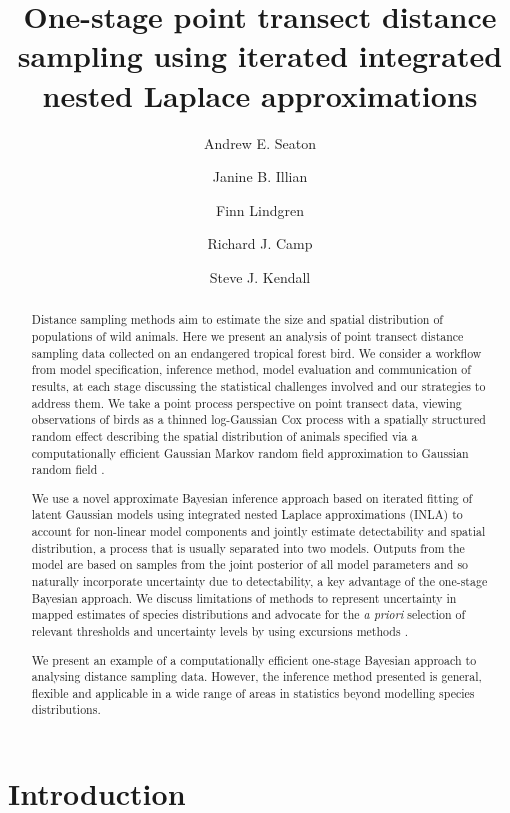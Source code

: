 \documentclass{stylefile16/statsoc}
\title[One-stage point transect distance sampling using iterated INLA]{One-stage point transect distance sampling using iterated integrated nested Laplace approximations}
\author[Andrew E. Seaton {\it et al.}]{Andrew E. Seaton}
\author{Janine B. Illian}
\author{Finn Lindgren}
\author{Richard J. Camp}
\author[Andrew E. Seaton \textit{et al.}]{Steve J. Kendall}
\begin{document}
\begin{abstract}
Distance sampling methods aim to estimate the size and spatial distribution of populations of wild animals.  Here we present an analysis of point transect distance sampling data collected on an endangered tropical forest bird.  We consider a workflow from model specification, inference method, model evaluation and communication of results, at each stage discussing the statistical challenges involved and our strategies to address them.  We take a point process perspective on point transect data, viewing observations of birds as a thinned log-Gaussian Cox process with a spatially structured random effect describing the spatial distribution of animals specified via a computationally efficient Gaussian Markov random field approximation to Gaussian random field \citep{lindgren_explicit_2011}.  

We use a novel approximate Bayesian inference approach based on iterated fitting of latent Gaussian models using integrated nested Laplace approximations (INLA) \citep{rue_approximate_2009} to account for non-linear model components and jointly estimate detectability and spatial distribution, a process that is usually separated into two models.  Outputs from the model are based on samples from the joint posterior of all model parameters and so naturally incorporate uncertainty due to detectability, a key advantage of the one-stage Bayesian approach.  We discuss limitations of methods to represent uncertainty in mapped estimates of species distributions and advocate for the \textit{a priori} selection of relevant thresholds and uncertainty levels by using excursions methods \citep{bolin_excursion_2015}.

We present an example of a computationally efficient one-stage Bayesian approach to analysing distance sampling data.  However, the inference method presented is general, flexible and applicable in a wide range of areas in statistics beyond modelling species distributions.

\end{abstract}


\section{Introduction}
\end{document}
